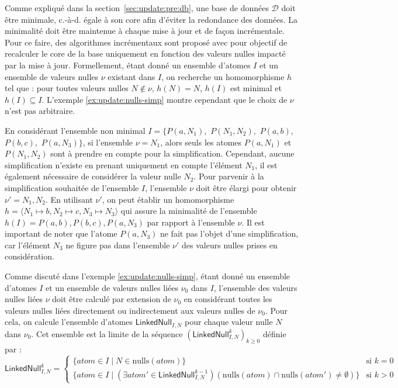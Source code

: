 Comme expliqué dans la section~\ref{sec:update:pre:db}, une base de données $\mathcal{D}$ doit être minimale, c.-à-d. égale à son \gls{core} afin d'éviter la redondance des données.
La minimalité doit être maintenue à chaque mise à jour et de façon incrémentale.
Pour ce faire, des algorithmes incrémentaux sont proposé avec pour objectif de recalculer le \gls{core}  de la base uniquement en fonction des valeurs nulles impacté par la mise à jour.
Formellement, étant donné un ensemble d'atomes $I$ et un ensemble de valeurs nulles $\nu$ existant dans $I$, on recherche un homomorphisme $h$ tel que : pour toutes valeurs nulles $N \notin \nu$, $h(N) = N$, $h(I)$ est minimal et $h(I) \subseteq I$.
L'exemple \ref{ex:update:nulls-simp} montre cependant que le choix de $\nu$ n'est pas arbitraire.

\begin{example}
	\label{ex:update:nulls-simp}
	En considérant l'ensemble non minimal $I = \{P(a, N_1),$ $P(N_1, N_2),$ $P(a, b),$ $P(b, c),$ $P(a, N_3)\}$, si l'ensemble $\nu = {N_1}$, alors seuls les atomes $P(a, N_1)$ et $P(N_1, N_2)$ sont à prendre en compte pour la simplification.
	Cependant, aucune simplification n'existe en prenant uniquement en compte l'élément $N_1$, il est également nécessaire de considérer la valeur nulle $N_2$.
	Pour parvenir à la simplification souhaitée de l'ensemble $I$, l'ensemble $\nu$ doit être élargi pour obtenir $\nu' = {N_1, N_2}$.
	En utilisant $\nu'$, on peut établir un homomorphisme $h = \langle N_1 \mapsto b, N_2 \mapsto c, N_3 \mapsto N_3 \rangle$ qui assure la minimalité de l'ensemble $h(I) = {P(a, b), P(b, c), P(a, N_3)}$ par rapport à l'ensemble $\nu$.
	Il est important de noter que l'atome $P(a, N_3)$ ne fait pas l'objet d'une simplification, car l'élément $N_3$ ne figure pas dans l'ensemble $\nu'$ des valeurs nulles prises en considération.
\end{example}

Comme discuté dans l'exemple \ref{ex:update:nulls-simp}, étant donné un ensemble d'atomes $I$ et un ensemble de valeurs nulles liées $\nu_0$ dans $I$, l'ensemble des valeurs nulles liées $\nu$ doit être calculé par extension de $\nu_0$ en considérant toutes les valeurs nulles liées directement ou indirectement aux valeurs nulles de $\nu_0$.
Pour cela, on calcule l'ensemble d'atomes $\textsf{LinkedNull}_{I,N}$ pour chaque valeur nulle $N$ dans $\nu_0$.
Cet ensemble est la limite de la séquence $(\textsf{LinkedNull}^k_{I,N})_{k \ge 0}$ définie par :
\begin{equation*}
	\textsf{LinkedNull}^k_{I,N} =
	\begin{cases}
		\{atom \in I \mid N \in \text{nulls}(atom)\}                                                                                        & \text{si } k = 0 \\
		\{atom \in I \mid (\exists atom' \in \textsf{LinkedNull}^{k-1}_{I,N})(\text{nulls}(atom) \cap \text{nulls}(atom') \neq \emptyset)\} & \text{si } k > 0
	\end{cases}
\end{equation*}

